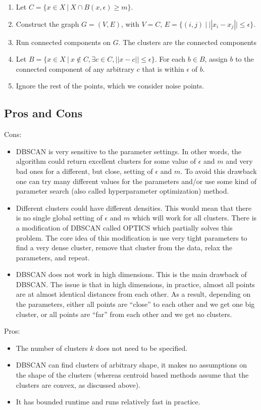   \begin{enumerate}
  \item Let $C=\{x \in X \ | \ X \cap B(x, \epsilon) \geq m\}$.
  \item Construct the graph $G=(V,E)$, with $V=C$, $E=\{(i,j) \ | \ ||x_i-x_j|| \leq \epsilon\}$.
  \item Run connected components on $G$. The clusters are the connected components
  \item Let $B=\{x \in X \ | \ x \notin C, \exists c \in C, ||x-c|| \leq \epsilon\}$.
  For each $b \in B$, assign $b$ to the connected component of any arbitrary $c$
  that is within $\epsilon$ of $b$.
  \item Ignore the rest of the points, which we consider noise points.

  \end{enumerate}

  \subsection{Pros and Cons}
  Cons:
  \begin{itemize}
    \item DBSCAN is very sensitive to the parameter settings. In other words, the algorithm could return excellent clusters for some value of $\epsilon$ and $m$
    and very bad ones for a different, but close, setting of $\epsilon$ and $m$. To avoid this drawback one can try many different values for the parameters and/or use
    some kind of parameter search (also called hyperparameter optimization) method.
    \item Different clusters could have different densities. This would mean that there is no single global setting of $\epsilon$ and $m$ which will work for all clusters.
    There is a modification of DBSCAN called OPTICS which partially solves this problem. The core idea of this modification is use very tight parameters to find a very
    dense cluster, remove that cluster from the data, relax the parameters, and repeat.
    \item DBSCAN does not work in high dimensions. This is the main drawback of DBSCAN. The issue is that in high dimensions, in practice, almost all points are
    at almost identical distances from each other. As a result, depending on the parameters, either all points are ``close'' to each other and we get one big
    cluster, or all points are ``far'' from each other and we get no clusters.
  \end{itemize}
  Pros:
  \begin{itemize}
    \item The number of clusters $k$ does not need to be specified.
    \item DBSCAN can find clusters of arbitrary shape, it makes no assumptions on the shape of the clusters (whereas centroid based methods assume that the clusters are convex, as discussed above).
    \item It has bounded runtime and runs relatively fast in practice.
  \end{itemize}

